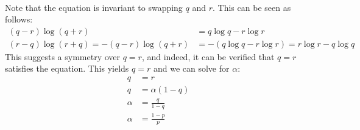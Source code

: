 \documentclass[11pt]{article}
\begin{document}
\begin{subparts}
\begin{enumerate}
{\begin{align*}
                \end{align*}
                Note that the equation is invariant to swapping $q$ and $r$. This can be seen as follows:
                \begin{align*}
                    (q - r) \log (q + r) &= q \log q - r \log r \\
                    (r - q) \log (r + q) = -(q - r) \log (q + r) &= - (q \log q - r \log r) = r \log r - q \log q
                \end{align*}
                This suggests a symmetry over $q = r$, and indeed, it can be verified that $q = r$ satisfies the equation. This yields $q = r$ and we can solve for $\alpha$:
                \begin{align*}
                    q &= r \\
                    q &= \alpha (1 - q) \\
                    \alpha &= \frac{q}{1 - q} \\
                    \alpha &= \frac{1 - p}{p}
                \end{align*}
            }
        \end{enumerate}
    \end{subparts}
\end{document}
